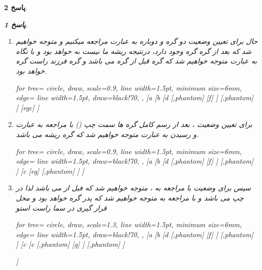 \documentclass[12pt]{article}
\newtheorem{answer}{پاسخ}[section]
\begin{document}
\begin{answer}
\begin{answer}
\begin{enumerate}
\item[گام سوم)]
حال برای تعیین وضعیت دو گره  و  دوباره به عبارت  مراجعه میکنیم و متوجه خواهیم شد که بعد از گره  گره  وجود دارد، درنتیجه  ریشه ما نیست به  خواهد بود و با نگاه به عبارت  متوجه خواهیم شد که گره  قبل از گره  می باشد و گره  فرزند راست گره  خواهد بود.
\begin{latin}
		\begin{forest}
		for tree={
			circle, draw,
			scale=0.9,
			line width=1.5pt,
			minimum size=6mm,
			edge={
				line width=1.5pt,
				draw=black!70,
				 },
		}
		[a
			[b
				[d
					[,phantom]
					[f]
				]
				[,phantom]
			]
			[egc]
		]
		\end{forest}
\end{latin}

\item[گام چهارم)]
برای  تعیین وضعیت ، بعد از رسم کامل گره ها سمت چپ () با مراجعه به عبارت  و رسیدن به عبارت 
 متوجه خواهیم شد که گره 
ریشه می باشد.\\	
\begin{latin}
		\begin{forest}
			for tree={
				circle, draw,
				scale=0.9,
				line width=1.5pt,
				minimum size=6mm,
				edge={
					line width=1.5pt,
					draw=black!70,
				},
			}
			[a
				[b
					[d
						[,phantom]
						[f]
					]
					[,phantom]
				]
				[c
					[eg]
					[,phantom]
				]
			]	
		\end{forest}
\end{latin}

\item[گام پنجم)]
سپس برای وضعیت  با مراجعه به ، متوجه خواهیم شد که  فبل از  می باشد لذا  در چپ می باشد و با مراجعه به  متوجه خواهیم شد که  پدر گره  خواهد بود و محل قرار گیری  در سما راست استو\\
	\begin{latin}
		\begin{forest}
			for tree={
				circle, draw,
				scale=1.3,
				line width=1.5pt,
				minimum size=6mm,
				edge={
					line width=1.5pt,
					draw=black!70,
				},
			}
		[a
			[b
				[d
					[,phantom]
					[f]
				]
				[,phantom]
			]
			[c
				[e
					[,phantom]
					[g]
				]
				[,phantom]
			]
			
		]	
		\end{forest}
\end{latin}
\end{enumerate}
\end{answer}


\end{answer}
\end{document}
